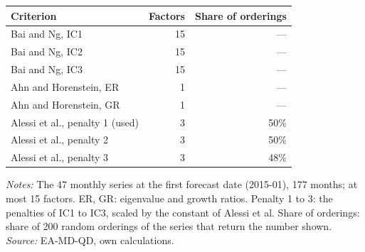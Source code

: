 \begin{threeparttable}
\begin{tabular}{lrr}
\toprule
Criterion & Factors & Share of orderings \\
\midrule
Bai and Ng, IC1 & 15 & --- \\
Bai and Ng, IC2 & 15 & --- \\
Bai and Ng, IC3 & 15 & --- \\
\midrule
Ahn and Horenstein, ER & 1 & --- \\
Ahn and Horenstein, GR & 1 & --- \\
\midrule
Alessi et al., penalty 1 (used) & 3 & 50\% \\
Alessi et al., penalty 2 & 3 & 50\% \\
Alessi et al., penalty 3 & 3 & 48\% \\
\bottomrule
\end{tabular}
\begin{tablenotes}[flushleft]\footnotesize
\item \textit{Notes:} The 47 monthly series at the first forecast date (2015-01), 177 months; at most 15 factors. ER, GR: eigenvalue and growth ratios. Penalty 1 to 3: the penalties of IC1 to IC3, scaled by the constant of Alessi et al. Share of orderings: share of 200 random orderings of the series that return the number shown. \textit{Source:} EA-MD-QD, own calculations.
\end{tablenotes}
\end{threeparttable}
